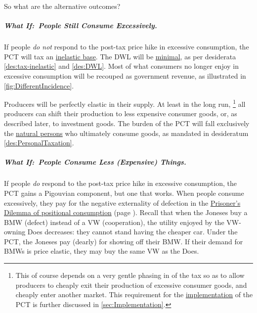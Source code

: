So what are the alternative outcomes?

\subparagraph{What If:~People Still Consume Excessively.}
If people \emph{do not} respond to the post-tax price hike in excessive consumption, the PCT will tax an \hyperref[des:tax-inelastic]{inelastic base}.
The DWL will be \hyperref[des:DWL]{minimal}, as per desiderata \ref{des:tax-inelastic} and \ref{des:DWL}.
Most of what consumers no longer enjoy in excessive consumption will be recouped as government revenue, as illustrated in \autoref{fig:DifferentIncidence}.

Producers will be perfectly elastic in their supply.
At least in the long run,
\footnote{
	This of course depends on a very gentle phasing in of the tax so as to allow producers to cheaply exit their production of excessive consumer goods, and cheaply enter another market.
	This requirement for the \hyperref[sec:Implementation]{implementation} of the PCT is further discussed in \autoref{sec:Implementation}.
}
all producers can shift their production to less expensive consumer goods, or, as described later, to investment goods.
The burden of the PCT will fall exclusively the \hyperref[des:PersonalTaxation]{natural persons} who ultimately consume goods, as mandated in desideratum \ref{des:PersonalTaxation}.

\subparagraph{What If:~People Consume Less (Expensive) Things.}
If people \emph{do} respond to the post-tax price hike in excessive consumption, the PCT gains a Pigouvian component, but one that works.
When people consume excessively, they pay for the negative externality of defection in the \hyperref[tab:PositionalPD]{Prisoner's Dilemma of positional consumption} (page \pageref{tab:PositionalPD}).
Recall that when the Joneses buy a BMW (defect) instead of a VW (cooperation), the utility enjoyed by the VW-owning Does decreases:
they cannot stand having the cheaper car.
Under the PCT, the Joneses pay (dearly) for showing off their BMW.
If their demand for BMWs is price elastic, they may buy the same VW as the Does.

